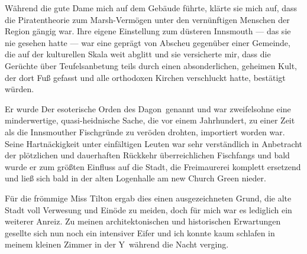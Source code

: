 Während die gute Dame mich auf dem Gebäude führte, klärte sie mich auf, dass die Piratentheorie zum Marsh-Vermögen unter den vernünftigen Menschen der Region gängig war. Ihre eigene Einstellung zum düsteren Innsmouth --- das sie nie gesehen hatte --- war eine geprägt von Abscheu gegenüber einer Gemeinde, die auf der kulturellen Skala weit abglitt und sie versicherte mir, dass die Gerüchte über Teufelsanbetung teils durch einen absonderlichen, geheimen Kult, der dort Fuß gefasst und alle orthodoxen Kirchen verschluckt hatte, bestätigt würden.

Er wurde \glqq Der esoterische Orden des Dagon\grqq\ genannt und war zweifelsohne eine minderwertige, quasi-heidnische Sache, die vor einem Jahrhundert, zu einer Zeit als die Innsmouther Fischgründe zu veröden drohten, importiert worden war. Seine Hartnäckigkeit unter einfältigen Leuten war sehr verständlich in Anbetracht der plötzlichen und dauerhaften Rückkehr überreichlichen Fischfangs und bald wurde er zum größten Einfluss auf die Stadt, die Freimaurerei komplett ersetzend und ließ sich bald in der alten Logenhalle am new Church Green nieder.

Für die frömmige Miss Tilton ergab dies einen ausgezeichneten Grund, die alte Stadt voll Verwesung und Einöde zu meiden, doch für mich war es lediglich ein weiterer Anreiz. Zu meinen architektonischen und historischen Erwartungen gesellte sich nun noch ein intensiver Eifer und ich konnte kaum schlafen in meinem kleinen Zimmer in der \glqq Y\grqq\ während die Nacht verging.
